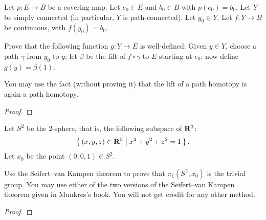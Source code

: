 \begin{problem}
Let $p\colon E\to B$ be a covering map. Let $e_0\in E$ and $b_0\in B$ with
$p(e_0)=b_0$. Let $Y$ be simply connected (in particular, $Y$ is
path-connected). Let $y_0\in Y$. Let $f\colon Y\to B$ be continuous, with
$f(y_0)=b_0$.

Prove that the following function $g\colon Y\to E$ is well-defined: Given
$y\in Y$, choose a path $\gamma$ from $y_0$ to $y$; let $\beta$ be the lift
of $f\circ\gamma$ to $E$ starting at $e_0$; now define $g(y)=\beta(1)$.

You may use the fact (without proving it) that the lift of a path homotopy
is again a path homotopy.
\end{problem}
\begin{proof}
\end{proof}

\begin{problem}
Let $S^2$ be the $2$-sphere, that is, the following subspace of $\mathbf{R}^3$:
\[
\left\{\,(x,y,z)\in\mathbf{R}^3\;\middle|\;x^2+y^2+z^2=1\,\right\}.
\]
Let $x_0$ be the point $(0,0,1)\in S^2$.

Use the Seifert--van Kampen theorem to prove that $\pi_1(S^2,x_0)$ is the
trivial group. You may use either of the two versions of the Seifert--van
Kampen theorem given in Munkres's book. You will not get credit for any
other method.
\end{problem}
\begin{proof}
\end{proof}

